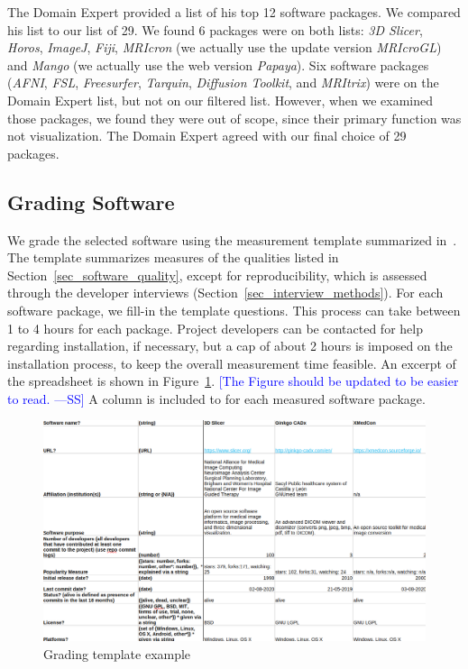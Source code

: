 \documentclass[final, 3p, times, authoryear]{elsarticle}
\newcommand{\authornote}[3]{\textcolor{#1}{[#3 ---#2]}}
\newcommand{\authornote}[3]{}
\newcommand{\wss}[1]{\authornote{blue}{SS}{#1}} %
\begin{document}
The Domain Expert provided a list of his top 12 software packages.  We compared
his list to our list of 29.  We found 6 packages were on both lists: \textit{3D
Slicer}, \textit{Horos}, \textit{ImageJ}, \textit{Fiji}, \textit{MRIcron} (we
actually use the update version \textit{MRIcroGL}) and \textit{Mango} (we
actually use the web version \textit{Papaya}).  Six software packages
(\textit{AFNI}, \textit{FSL}, \textit{Freesurfer}, \textit{Tarquin},
\textit{Diffusion Toolkit}, and \textit{MRItrix}) were on the Domain Expert
list, but not on our filtered list.  However, when we examined those packages,
we found they were out of scope, since their primary function was not
visualization.  The Domain Expert agreed with our final choice of 29 packages.

\subsection{Grading Software} \label{sec_grading_software}

We grade the selected software using the measurement template summarized
in~\citet{SmithEtAl2021}.  The template summarizes measures of the qualities
listed in Section~\ref{sec_software_quality}, except for reproducibility, which
is assessed through the developer interviews
(Section~\ref{sec_interview_methods}). For each software package, we fill-in the
template questions. This process can take between 1 to 4 hours for each package.
Project developers can be contacted for help regarding installation, if
necessary, but a cap of about 2 hours is imposed on the
installation process, to keep the overall measurement time feasible. An excerpt
of the spreadsheet is shown in Figure~\ref{fg_grading_template_example}.
\wss{The Figure should be updated to be easier to read.}  A column is included
to for each measured software package.

\begin{figure}[!ht]
\includegraphics[scale=0.42]{figures/template.png}
\caption{Grading template example}
\label{fg_grading_template_example}
\end{figure}
\end{document}
